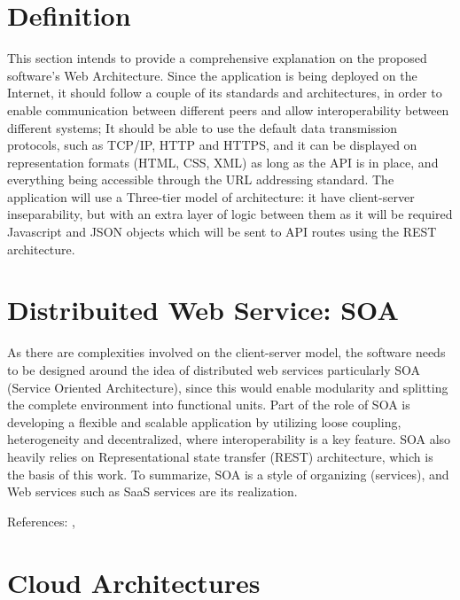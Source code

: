 \label{chap:web_architecture}
\acresetall 

\section{Definition}

This section intends to provide a comprehensive explanation on the proposed software's Web Architecture. Since the application is being deployed on the Internet, it should follow a couple of its standards and architectures, in order to enable communication between different peers and allow interoperability between different systems; It should be able to use the default data transmission protocols, such as TCP/IP, HTTP and HTTPS, and it can be displayed on representation formats (HTML, CSS, XML) as long as the API is in place, and everything being accessible through the URL addressing standard. The application will use a Three-tier model of architecture: it have client-server inseparability, but with an extra layer of logic between them as it will be required Javascript and JSON objects which will be sent to API routes using the REST architecture. 

\section{Distribuited Web Service: SOA}
\acresetall

As there are complexities involved on the client-server model, the software needs to be designed around the idea of distributed web services particularly SOA (Service Oriented Architecture), since this would enable modularity and splitting the complete environment into functional units. Part of the role of SOA is developing a flexible and scalable application by utilizing loose coupling, heterogeneity and decentralized, where interoperability is a key feature. SOA also heavily relies on Representational state transfer (REST) architecture, which is the basis of this work. To summarize, SOA is a style of organizing (services), and Web services such as SaaS services are its realization.

References: ,  

\section{Cloud Architectures}
\acresetall

